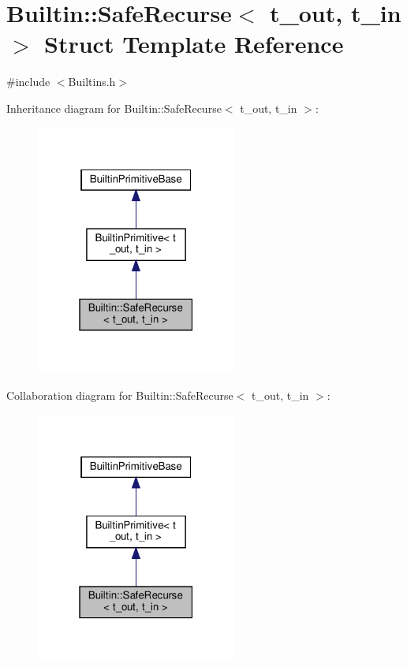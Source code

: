 \hypertarget{struct_builtin_1_1_safe_recurse}{}\section{Builtin\+:\+:Safe\+Recurse$<$ t\+\_\+out, t\+\_\+in $>$ Struct Template Reference}
\label{struct_builtin_1_1_safe_recurse}


{\ttfamily \#include $<$Builtins.\+h$>$}



Inheritance diagram for Builtin\+:\+:Safe\+Recurse$<$ t\+\_\+out, t\+\_\+in $>$\+:\nopagebreak
\begin{figure}[H]
\begin{center}
\leavevmode
\includegraphics[width=187pt]{struct_builtin_1_1_safe_recurse__inherit__graph}
\end{center}
\end{figure}


Collaboration diagram for Builtin\+:\+:Safe\+Recurse$<$ t\+\_\+out, t\+\_\+in $>$\+:\nopagebreak
\begin{figure}[H]
\begin{center}
\leavevmode
\includegraphics[width=187pt]{struct_builtin_1_1_safe_recurse__coll__graph}
\end{center}
\end{figure}

